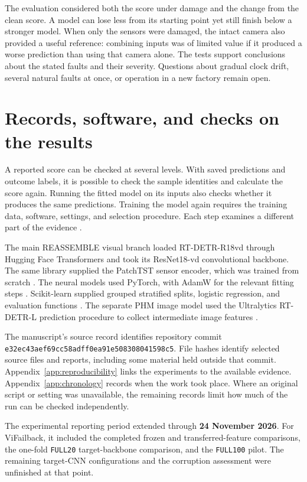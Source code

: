 The evaluation considered both the score under damage and the change from the clean
score. A model can lose less from its starting point yet still finish below a stronger
model. When only the sensors were damaged, the intact camera also provided a useful
reference: combining inputs was of limited value if it produced a worse prediction than
using that camera alone. The tests support conclusions about the stated faults and their
severity. Questions about gradual clock drift, several natural faults at once, or
operation in a new factory remain open.

\section{Records, software, and checks on the results}
\label{sec:ch4-reproducibility}

A reported score can be checked at several levels. With saved predictions and outcome
labels, it is possible to check the sample identities and calculate the score again.
Running the fitted model on its inputs also checks whether it produces the same
predictions. Training the model again requires the training data, software, settings,
and selection procedure. Each step examines a different part of the evidence
\parencite{P009}.

The main REASSEMBLE visual branch loaded RT-DETR-R18vd through Hugging Face Transformers
and took its ResNet18-vd convolutional backbone. The same library supplied the PatchTST
sensor encoder, which was trained from scratch \parencite{Wolf2020Transformers}. The
neural models used PyTorch, with AdamW for the relevant fitting steps
\parencite{Paszke2019PyTorch}. Scikit-learn supplied grouped stratified splits, logistic
regression, and evaluation functions \parencite{Pedregosa2011ScikitLearn}. The separate
PHM image model used the Ultralytics RT-DETR-L prediction procedure to collect
intermediate image features \parencite{UltralyticsRTDETR}.

The manuscript’s source record identifies repository commit
\texttt{e32ec43aef69cc58adff0ea91e508308041598c5}. File hashes identify selected source
files and reports, including some material held outside that commit.
Appendix~\ref{app:reproducibility} links the experiments to the available evidence.
Appendix~\ref{app:chronology} records when the work took place. Where an original script
or setting was unavailable, the remaining records limit how much of the run can be
checked independently.

The experimental reporting period extended through \textbf{24 November 2026}. For
ViFailback, it included the completed frozen and transferred-feature comparisons, the
one-fold \texttt{FULL20} target-backbone comparison, and the \texttt{FULL100} pilot. The
remaining target-CNN configurations and the corruption assessment were unfinished at
that point.

